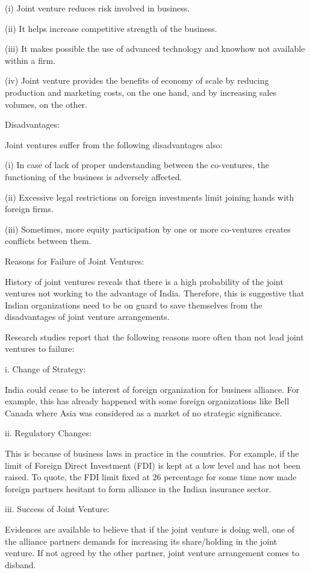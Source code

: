 \documentclass{article}
\begin{document}
(i) Joint venture reduces risk involved in business.

(ii) It helps increase competitive strength of the business.

(iii) It makes possible the use of advanced technology and knowhow not available within a firm.

(iv) Joint venture provides the benefits of economy of scale by reducing production and marketing costs, on the one hand, and by 
increasing sales volumes, on the other.

Disadvantages:

Joint ventures suffer from the following disadvantages also:

(i) In case of lack of proper understanding between the co-ventures, the functioning of the business is adversely affected.

(ii) Excessive legal restrictions on foreign investments limit joining hands with foreign firms.

(iii) Sometimes, more equity participation by one or more co-ventures creates conflicts between them.

Reasons for Failure of Joint Ventures:

History of joint ventures reveals that there is a high probability of the joint ventures not working to the advantage of India. 
Therefore, this is suggestive that Indian organizations need to be on guard to save themselves from the disadvantages of joint
 venture arrangements.

Research studies report that the following reasons more often than not lead joint ventures to failure:

i. Change of Strategy:

India could cease to be interest of foreign organization for business alliance. For example, this has already happened with some
 foreign organizations like Bell Canada where Asia was considered as a market of no strategic significance.

ii. Regulatory Changes:

This is because of business laws in practice in the countries. For example, if the limit of Foreign Direct Investment (FDI) is 
kept at a low level and has not been raised. To quote, the FDI limit fixed at 26 percentage for some time now made foreign partners hesitant to form alliance in the Indian insurance sector.

iii. Success of Joint Venture:

Evidences are available to believe that if the joint venture is doing well, one of the alliance partners demands for increasing
 its share/holding in the joint venture. If not agreed by the other partner, joint venture arrangement comes to disband.
\end{document}
